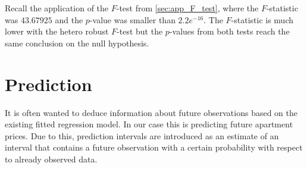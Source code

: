 Recall the application of the $F$-test from \ref{sec:app_F_test}, where the $F$-statistic was $43.67925$ and the $p$-value was smaller than $2.2e^{-16}$. The $F$-statistic is much lower with the hetero robust $F$-test but the $p$-values from both tests reach the same conclusion on the null hypothesis. 




    

































\section{Prediction}\label{sec:prediction}
It is often wanted to deduce information about future observations based on the existing fitted regression model. 
In our case this is predicting future apartment prices. 
Due to this, prediction intervals are introduced as an estimate of an interval that contains a future observation with a certain probability with respect to already observed data.


